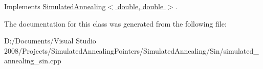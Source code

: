 Implements \hyperlink{class_simulated_annealing_a71b64ea8dca2d5bba7fb6d4b6cde1c81}{SimulatedAnnealing$<$ double, double $>$}.

The documentation for this class was generated from the following file:\begin{DoxyCompactItemize}
\item 
D:/Documents/Visual Studio 2008/Projects/SimulatedAnnealingPointers/SimulatedAnnealing/Sin/simulated\_\-annealing\_\-sin.cpp\end{DoxyCompactItemize}
